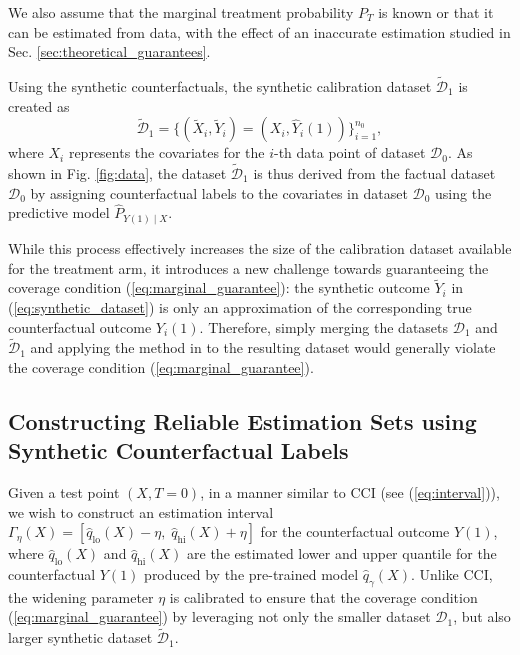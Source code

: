 \documentclass{article}
\theoremstyle{plain}
\theoremstyle{definition}
\theoremstyle{remark}
\begin{document}
We also assume that the marginal treatment probability $P_T$ is known or that it can be estimated from data, with the effect of an inaccurate estimation studied in Sec. \ref{sec:theoretical_guarantees}.

Using the synthetic counterfactuals, the synthetic calibration dataset $\tilde{\mathcal{D}}_1$ is created as
\begin{equation}
\label{eq:synthetic_dataset}
\tilde{\mathcal{D}}_1 = \{ (\tilde{X}_i, \tilde{Y}_i) = (X_i, \hat{Y}_i(1))\}_{i = 1}^{n_0},
\end{equation}
where $X_i$ represents the covariates for the $i$-th data point of dataset $\mathcal{D}_0$. As shown in Fig. \ref{fig:data}, the dataset \( \tilde{\mathcal{D}}_1 \) is thus derived from the factual dataset \( \mathcal{D}_0 \) by assigning counterfactual labels to the covariates in dataset $\mathcal{D}_0$ using the predictive model $\hat{P}_{Y(1)\mid X}$.

While this process effectively increases the size of the calibration dataset available for the treatment arm, it introduces a new challenge towards guaranteeing the coverage condition (\ref{eq:marginal_guarantee}): the synthetic outcome \( \tilde{Y}_i \) in (\ref{eq:synthetic_dataset}) is only an approximation of the corresponding true counterfactual outcome $Y_i(1)$. Therefore, simply merging the datasets \( \mathcal{D}_1 \) and \( \tilde{\mathcal{D}}_1 \) and applying the method in \citep{lei2021conformal} to the resulting dataset would generally violate the coverage condition (\ref{eq:marginal_guarantee}).



\subsection{Constructing Reliable Estimation Sets using Synthetic Counterfactual Labels}

Given a test point \( (X, T = 0) \), in a manner similar to CCI (see (\ref{eq:interval})), we wish to construct an estimation interval \( \Gamma_\eta(X) = [\hat{q}_{\text{lo}}(X) - \eta,\; \hat{q}_{\text{hi}}(X) + \eta] \) for the counterfactual outcome \( Y(1) \), where \( \hat{q}_{\text{lo}}(X) \) and \( \hat{q}_{\text{hi}}(X) \) are the estimated lower and upper quantile for the counterfactual $Y(1)$ produced by the pre-trained model $\hat{q}_\gamma (X)$. Unlike CCI, the widening parameter \( \eta \) is calibrated to ensure that the coverage condition (\ref{eq:marginal_guarantee}) by leveraging not only the smaller dataset $\mathcal{D}_1$, but also larger synthetic dataset $\tilde{\mathcal{D}}_1$.
\end{document}
